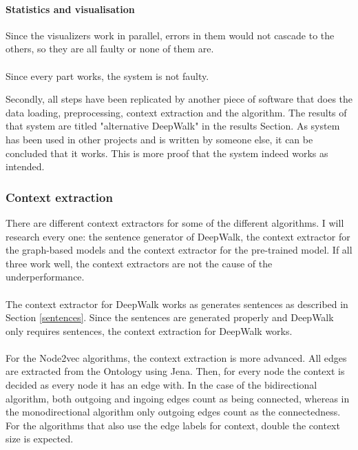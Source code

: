 \documentclass{article}
\begin{document}
  \paragraph{Statistics and visualisation}
  Since the visualizers work in parallel, errors in them would not cascade to the others, so they are all faulty or none of them are.
  \paragraph{}
  Since every part works, the system is not faulty. %
  
  Secondly, all steps have been replicated by another piece of software that does the data loading, preprocessing, context extraction and the algorithm. The results of that system are titled "alternative DeepWalk" in the results Section. As system has been used in other projects and is written by someone else, it can be concluded that it works. This is more proof that the system indeed works as intended.
  
  \subsubsection{Context extraction}
  There are different context extractors for some of the different algorithms. I will research every one: the sentence generator of DeepWalk, the context extractor for the graph-based models and the context extractor for the pre-trained model. If all three work well, the context extractors are not the cause of the underperformance.
  \paragraph{}
  The context extractor for DeepWalk works as generates sentences as described in Section \ref{sentences}. Since the sentences are generated properly and DeepWalk only requires sentences, the context extraction for DeepWalk works.
  \paragraph{}
  For the Node2vec algorithms, the context extraction is more advanced. All edges are extracted from the Ontology using Jena. Then, for every node the context is decided as every node it has an edge with. In the case of the bidirectional algorithm, both outgoing and ingoing edges count as being connected, whereas in the monodirectional algorithm only outgoing edges count as the connectedness. For the algorithms that also use the edge labels for context, double the context size is expected.
\end{document}

